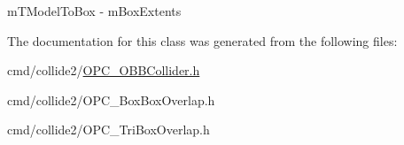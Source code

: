 \begin{DoxyItemize}
\item m\+T\+Model\+To\+Box -\/ m\+Box\+Extents 
\end{DoxyItemize}

The documentation for this class was generated from the following files\+:\begin{DoxyCompactItemize}
\item 
cmd/collide2/\hyperlink{OPC__OBBCollider_8h}{O\+P\+C\+\_\+\+O\+B\+B\+Collider.\+h}\item 
cmd/collide2/O\+P\+C\+\_\+\+Box\+Box\+Overlap.\+h\item 
cmd/collide2/O\+P\+C\+\_\+\+Tri\+Box\+Overlap.\+h\end{DoxyCompactItemize}
